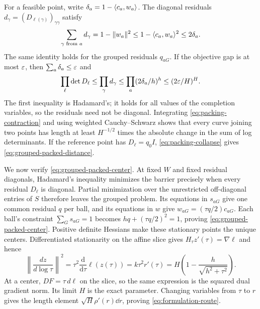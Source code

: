 For a feasible point, write $\delta_a=1-\langle c_a,w_a\rangle$.
The diagonal residuals $d_\gamma=(D_{\ell(\gamma)})_{\gamma\gamma}$
satisfy
\[
 \sum_{\gamma\text{ from }a}d_\gamma=1-\lVert w_a\rVert^2
 \leq1-\langle c_a,w_a\rangle^2\leq2\delta_a.
\]
The same identity holds for the grouped residuals $q_{aG}$. If the
objective gap is at most $\varepsilon$, then $\sum_a\delta_a\leq\varepsilon$ and
\begin{equation}
 \prod_\ell\det D_\ell
 \leq\prod_\gamma d_\gamma
 \leq\prod_a(2\delta_a/h)^h
 \leq(2\varepsilon/H)^H.
 \label{eq:packing-collapse}
\end{equation}
The first inequality is Hadamard's; it holds for all values of the
completion variables, so the residuals need not be diagonal. Integrating \eqref{eq:packing-contraction} and using weighted
Cauchy--Schwarz shows that every curve joining two points has length at least
$H^{-1/2}$ times the absolute change in the sum of log determinants.
If the reference point has $D_\ell=q_0I$,
\eqref{eq:packing-collapse} gives \eqref{eq:grouped-packed-distance}.

We now verify \eqref{eq:grouped-packed-center}. At
fixed $W$
and fixed residual diagonals, Hadamard's inequality minimizes the
barrier precisely when every residual $D_\ell$ is diagonal.
Partial minimization over the unrestricted off-diagonal entries of $S$
therefore leaves the grouped problem. Its equations in $s_{aG}$ give
one common residual $q$ per ball, and its equations in $w$ give
$w_{aG}=(\tau q/2)c_{aG}$. Each ball's constraint $\sum_Gs_{aG}=1$ becomes
$hq+(\tau q/2)^2=1$, proving \eqref{eq:grouped-packed-center}.
Positive definite Hessians make these stationary points the unique
centers. Differentiated stationarity on the affine slice gives
$H_\tau z'(\tau)=\nabla\ell$ and hence
\[
 \left\|\frac{dz}{d\log\tau}\right\|^2
 =\tau^2\frac{\mathrm d}{\mathrm d\tau}\ell(z(\tau))
 =k\tau^2r'(\tau)
 =H\left(1-\frac h{\sqrt{h^2+\tau^2}}\right).
\]
At a center, $DF=\tau\,d\ell$ on the slice, so the same expression is
the squared dual gradient norm. Its limit $H$ is the exact parameter.
Changing variables from $\tau$ to $r$ gives the length element
$\sqrt H\rho'(r)\dd r$, proving \eqref{eq:formulation-route}.

